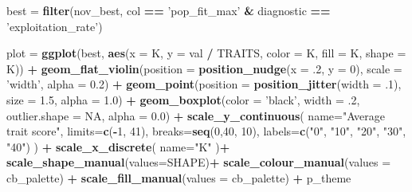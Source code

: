 \documentclass[]{book}
\newenvironment{Shaded}{\begin{snugshade}}{\end{snugshade}}
\newcommand{\DataTypeTok}[1]{\textcolor[rgb]{0.13,0.29,0.53}{#1}}
\newcommand{\DecValTok}[1]{\textcolor[rgb]{0.00,0.00,0.81}{#1}}
\newcommand{\FloatTok}[1]{\textcolor[rgb]{0.00,0.00,0.81}{#1}}
\newcommand{\KeywordTok}[1]{\textcolor[rgb]{0.13,0.29,0.53}{\textbf{#1}}}
\newcommand{\NormalTok}[1]{#1}
\newcommand{\OperatorTok}[1]{\textcolor[rgb]{0.81,0.36,0.00}{\textbf{#1}}}
\newcommand{\OtherTok}[1]{\textcolor[rgb]{0.56,0.35,0.01}{#1}}
\newcommand{\StringTok}[1]{\textcolor[rgb]{0.31,0.60,0.02}{#1}}
\begin{document}
\begin{Shaded}
\begin{Highlighting}[]
\NormalTok{best =}\StringTok{ }\KeywordTok{filter}\NormalTok{(nov_best, col }\OperatorTok{==}\StringTok{ 'pop_fit_max'} \OperatorTok{&}\StringTok{ }\NormalTok{diagnostic }\OperatorTok{==}\StringTok{ 'exploitation_rate'}\NormalTok{)}

\NormalTok{plot =}\StringTok{ }\KeywordTok{ggplot}\NormalTok{(best, }\KeywordTok{aes}\NormalTok{(}\DataTypeTok{x =}\NormalTok{ K, }\DataTypeTok{y =}\NormalTok{ val }\OperatorTok{/}\StringTok{ }\NormalTok{TRAITS, }\DataTypeTok{color =}\NormalTok{ K, }\DataTypeTok{fill =}\NormalTok{ K, }\DataTypeTok{shape =}\NormalTok{ K)) }\OperatorTok{+}
\StringTok{  }\KeywordTok{geom_flat_violin}\NormalTok{(}\DataTypeTok{position =} \KeywordTok{position_nudge}\NormalTok{(}\DataTypeTok{x =} \FloatTok{.2}\NormalTok{, }\DataTypeTok{y =} \DecValTok{0}\NormalTok{), }\DataTypeTok{scale =} \StringTok{'width'}\NormalTok{, }\DataTypeTok{alpha =} \FloatTok{0.2}\NormalTok{) }\OperatorTok{+}
\StringTok{  }\KeywordTok{geom_point}\NormalTok{(}\DataTypeTok{position =} \KeywordTok{position_jitter}\NormalTok{(}\DataTypeTok{width =} \FloatTok{.1}\NormalTok{), }\DataTypeTok{size =} \FloatTok{1.5}\NormalTok{, }\DataTypeTok{alpha =} \FloatTok{1.0}\NormalTok{) }\OperatorTok{+}
\StringTok{  }\KeywordTok{geom_boxplot}\NormalTok{(}\DataTypeTok{color =} \StringTok{'black'}\NormalTok{, }\DataTypeTok{width =} \FloatTok{.2}\NormalTok{, }\DataTypeTok{outlier.shape =} \OtherTok{NA}\NormalTok{, }\DataTypeTok{alpha =} \FloatTok{0.0}\NormalTok{) }\OperatorTok{+}
\StringTok{  }\KeywordTok{scale_y_continuous}\NormalTok{(}
    \DataTypeTok{name=}\StringTok{"Average trait score"}\NormalTok{,}
    \DataTypeTok{limits=}\KeywordTok{c}\NormalTok{(}\OperatorTok{-}\DecValTok{1}\NormalTok{, }\DecValTok{41}\NormalTok{),}
    \DataTypeTok{breaks=}\KeywordTok{seq}\NormalTok{(}\DecValTok{0}\NormalTok{,}\DecValTok{40}\NormalTok{, }\DecValTok{10}\NormalTok{),}
    \DataTypeTok{labels=}\KeywordTok{c}\NormalTok{(}\StringTok{"0"}\NormalTok{, }\StringTok{"10"}\NormalTok{, }\StringTok{"20"}\NormalTok{, }\StringTok{"30"}\NormalTok{, }\StringTok{"40"}\NormalTok{)}
\NormalTok{  ) }\OperatorTok{+}
\StringTok{  }\KeywordTok{scale_x_discrete}\NormalTok{(}
    \DataTypeTok{name=}\StringTok{"K"}
\NormalTok{  )}\OperatorTok{+}
\StringTok{  }\KeywordTok{scale_shape_manual}\NormalTok{(}\DataTypeTok{values=}\NormalTok{SHAPE)}\OperatorTok{+}
\StringTok{  }\KeywordTok{scale_colour_manual}\NormalTok{(}\DataTypeTok{values =}\NormalTok{ cb_palette) }\OperatorTok{+}
\StringTok{  }\KeywordTok{scale_fill_manual}\NormalTok{(}\DataTypeTok{values =}\NormalTok{ cb_palette) }\OperatorTok{+}
\StringTok{  }\NormalTok{p_theme}


\end{Highlighting}
\end{Shaded}
\end{document}
